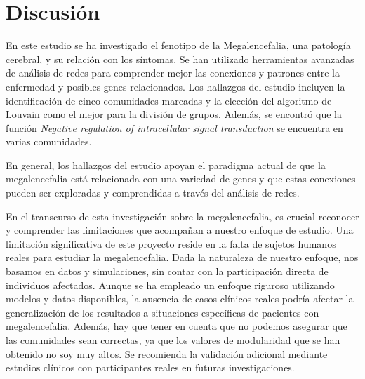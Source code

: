 \section{Discusión}


En este estudio se ha investigado el fenotipo de la Megalencefalia, una patología cerebral, y su relación con los síntomas. Se han utilizado herramientas avanzadas de análisis de redes para comprender mejor las conexiones y patrones entre la enfermedad y posibles genes relacionados. Los hallazgos del estudio incluyen la identificación de cinco comunidades marcadas y la elección del algoritmo de Louvain como el mejor para la división de grupos. Además, se encontró que la función \textit{Negative regulation of intracellular signal transduction} se encuentra en varias comunidades.

En general, los hallazgos del estudio apoyan el paradigma actual de que la megalencefalia está relacionada con una variedad de genes y que estas conexiones pueden ser exploradas y comprendidas a través del análisis de redes.

En el transcurso de esta investigación sobre la megalencefalia, es crucial reconocer y comprender las limitaciones que acompañan a nuestro enfoque de estudio. Una limitación significativa de este proyecto reside en la falta de sujetos humanos reales para estudiar la megalencefalia. Dada la naturaleza de nuestro enfoque, nos basamos en datos y simulaciones, sin contar con la participación directa de individuos afectados. Aunque se ha empleado un enfoque riguroso utilizando modelos y datos disponibles, la ausencia de casos clínicos reales podría afectar la generalización de los resultados a situaciones específicas de pacientes con megalencefalia. Además, hay que tener en cuenta que no podemos asegurar que las comunidades sean correctas, ya que los valores de modularidad que se han obtenido no soy muy altos. Se recomienda la validación adicional mediante estudios clínicos con participantes reales en futuras investigaciones. 





